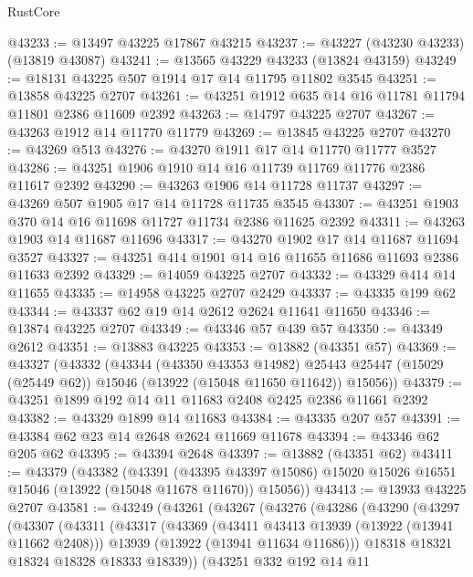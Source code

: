 \begin{lexlean}{RustCore}
\begin{coremodule}
@43233 := @13497 @43225 @17867 @43215
@43237 := @43227 (@43230 @43233) (@13819 @43087)
@43241 := @13565 @43229 @43233 (@13824 @43159)
@43249 := @18131 @43225 @507 @1914 @17 @14 @11795 @11802 @3545
@43251 := @13858 @43225 @2707
@43261 := @43251 @1912 @635 @14 @16 @11781 @11794 @11801 @2386 @11609 @2392
@43263 := @14797 @43225 @2707
@43267 := @43263 @1912 @14 @11770 @11779
@43269 := @13845 @43225 @2707
@43270 := @43269 @513
@43276 := @43270 @1911 @17 @14 @11770 @11777 @3527
@43286 := @43251 @1906 @1910 @14 @16 @11739 @11769 @11776 @2386 @11617 @2392
@43290 := @43263 @1906 @14 @11728 @11737
@43297 := @43269 @507 @1905 @17 @14 @11728 @11735 @3545
@43307 := @43251 @1903 @370 @14 @16 @11698 @11727 @11734 @2386 @11625 @2392
@43311 := @43263 @1903 @14 @11687 @11696
@43317 := @43270 @1902 @17 @14 @11687 @11694 @3527
@43327 := @43251 @414 @1901 @14 @16 @11655 @11686 @11693 @2386 @11633 @2392
@43329 := @14059 @43225 @2707
@43332 := @43329 @414 @14 @11655
@43335 := @14958 @43225 @2707 @2429
@43337 := @43335 @199 @62
@43344 := @43337 @62 @19 @14 @2612 @2624 @11641 @11650
@43346 := @13874 @43225 @2707
@43349 := @43346 @57 @439 @57
@43350 := @43349 @2612
@43351 := @13883 @43225
@43353 := @13882 (@43351 @57)
@43369 := @43327
    (@43332
      (@43344
        (@43350 @43353 @14982)
        @25443
        @25447
        (@15029 (@25449 @62))
        @15046
        (@13922 (@15048 @11650 @11642))
        @15056))
@43379 := @43251 @1899 @192 @14 @11 @11683 @2408 @2425 @2386 @11661 @2392
@43382 := @43329 @1899 @14 @11683
@43384 := @43335 @207 @57
@43391 := @43384 @62 @23 @14 @2648 @2624 @11669 @11678
@43394 := @43346 @62 @205 @62
@43395 := @43394 @2648
@43397 := @13882 (@43351 @62)
@43411 := @43379
    (@43382
      (@43391
        (@43395 @43397 @15086)
        @15020
        @15026
        @16551
        @15046
        (@13922 (@15048 @11678 @11670))
        @15056))
@43413 := @13933 @43225 @2707
@43581 := @43249
    (@43261
      (@43267
        (@43276
          (@43286
            (@43290
              (@43297
                (@43307
                  (@43311
                    (@43317
                      (@43369
                        (@43411 @43413 @13939 (@13922 (@13941 @11662 @2408)))
                        @13939
                        (@13922 (@13941 @11634 @11686)))
                      @18318
                      @18321
                      @18324
                      @18328
                      @18333
                      @18339))
                  (@43251
                    @332
                    @192
                    @14
                    @11

\end{coremodule}
\end{lexlean}
